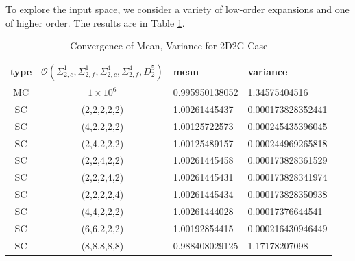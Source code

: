 To explore the input space, we consider a variety of low-order expansions and one of higher order.  The results are in Table \ref{tab:2dcrit5v}.

\begin{table}[H]
\begin{center}
\begin{tabular}{c c|l l}
type & $\mathcal{O}(\Sigma_{2,c}^1,\Sigma_{2,f}^1,\Sigma_{2,c}^4,\Sigma_{2,f}^4,D^5_2)$ & mean & variance \\ \hline
MC & $1\times10^6$ & 0.995950138052 & 1.34575404516 \\
SC & (2,2,2,2,2)  & 1.00261445437 & 0.000173828352441 \\
SC & (4,2,2,2,2)  & 1.00125722573 & 0.000245435396045 \\
SC & (2,4,2,2,2)  & 1.00125489157 & 0.000244969265818 \\
SC & (2,2,4,2,2)  & 1.00261445458 & 0.000173828361529 \\
SC & (2,2,2,4,2)  & 1.00261445431 & 0.000173828341974 \\
SC & (2,2,2,2,4)  & 1.00261445434 & 0.000173828350938 \\
SC & (4,4,2,2,2)  & 1.00261444028 & 0.00017376644541\\
SC & (6,6,2,2,2)  & 1.00192854415 & 0.000216430946449 \\
SC & (8,8,8,8,8) & 0.988408029125 & 1.17178207098
\end{tabular}
\end{center}
\caption{Convergence of Mean, Variance for 2D2G Case}
\label{tab:2dcrit5v}
\end{table}

